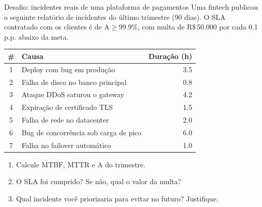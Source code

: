 \documentclass{beamer}
\newcommand{\A}{\mathrm{A}}
\newcommand{\MTBF}{\mathrm{MTBF}}
\newcommand{\MTTR}{\mathrm{MTTR}}
\begin{document}
\begin{frame}{Desafio: incidentes reais de uma plataforma de pagamentos}
\small
Uma fintech publicou o seguinte relatório de incidentes do último trimestre (90 dias).
O SLA contratado com os clientes é de \(\A \ge 99.9\%\), com multa de R\$\,50.000 por cada
0.1 p.p. abaixo da meta.

\vspace{0.4em}
\footnotesize
\centering
\begin{tabular}{c l r}
\toprule
\textbf{\#} & \textbf{Causa} & \textbf{Duração (h)}\\
\midrule
1 & Deploy com bug em produção & 3.5 \\
2 & Falha de disco no banco principal & 0.8 \\
3 & Ataque DDoS saturou o gateway & 4.2 \\
4 & Expiração de certificado TLS & 1.5 \\
5 & Falha de rede no datacenter & 2.0 \\
6 & Bug de concorrência sob carga de pico & 6.0 \\
7 & Falha no failover automático & 1.0 \\
\bottomrule
\end{tabular}

\vspace{0.5em}
\raggedright
\normalsize
\begin{enumerate}
  \item Calcule \(\MTBF\), \(\MTTR\) e \(\A\) do trimestre.
  \item O SLA foi cumprido? Se não, qual o valor da multa?
  \item Qual incidente você priorizaria para evitar no futuro? Justifique.
\end{enumerate}
\end{frame}
\end{document}
